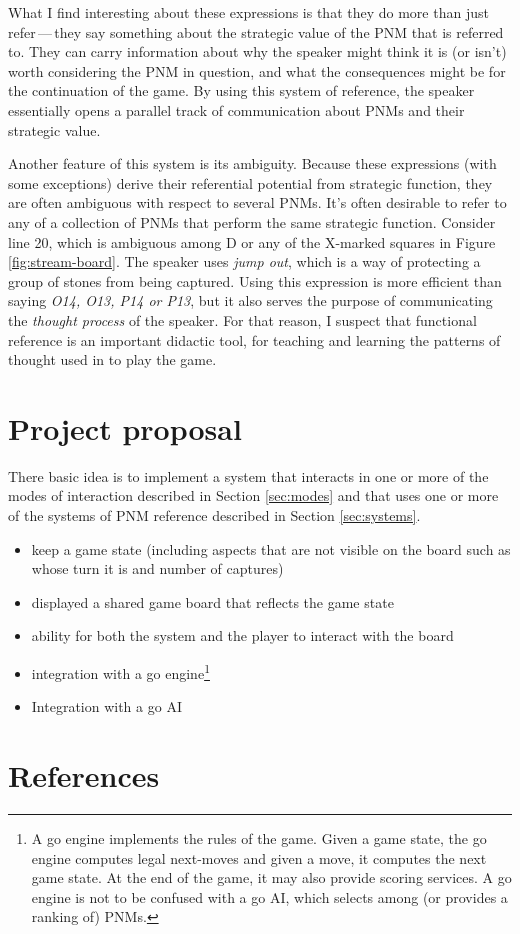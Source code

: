 \documentclass{scrartcl}
\begin{document}
What I find interesting about these expressions is that they do more than
just refer\,---\,they say something about the strategic value of the PNM
that is referred to. 
They can carry information about why the speaker might think it is (or isn't)
worth considering the PNM in question, and what the consequences might be for
the continuation of the game.
By using this system of reference, the speaker essentially opens a  
parallel track of communication about PNMs and their strategic value.

Another feature of this system is its ambiguity. 
Because these expressions (with some exceptions) derive their referential
potential from strategic function, they are often ambiguous with respect
to several PNMs.
It's often desirable to refer to any of a collection of PNMs that perform
the same strategic function. Consider line 20, 
which is ambiguous among D or any of the X-marked squares in Figure \ref{fig:stream-board}. 
The speaker uses \textit{jump out}, which is a way of protecting a group of stones from
being captured.
Using this expression is more efficient than saying \textit{O14, O13, P14 or P13},
but it also serves the purpose of communicating the \emph{thought process}
of the speaker.
For that reason, I suspect that functional reference is an important didactic tool,
for teaching and learning the patterns of thought used in to play the game.


\section{Project proposal}\label{sec:proposal}

There basic idea is to implement a system that interacts in one or more 
of the modes of interaction described in Section \ref{sec:modes} 
and that uses one or more of the systems of PNM reference described in Section \ref{sec:systems}.

\begin{itemize}
  \item keep a game state (including aspects that are not visible on the board such as whose turn it is and number of captures)
  \item displayed a shared game board that reflects the game state
  \item ability for both the system and the player to interact with the board
  \item integration with a go engine\footnote{A go engine implements the rules of the game.
      Given a game state, the go engine 
      computes legal next-moves and given a move, it computes the next game state.
      At the end of the game, it may also provide scoring services.
      A go engine is not to be confused with a go AI, which selects among (or provides a ranking of)
      PNMs.}
  \item Integration with a go AI
\end{itemize}

\section{References}
\printbibliography[heading=none]
\end{document}
